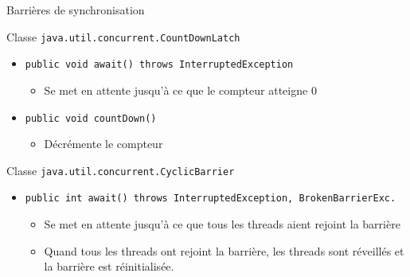 
\begingroup

\begin{frame}{Barrières de synchronisation}

  \begin{exampleblock}{Classe \lstinline+java.util.concurrent.CountDownLatch+}
    \begin{itemize}
    \item \lstinline+public void await() throws InterruptedException+\\
      \begin{itemize}
      \item Se met en attente jusqu'à ce que le compteur atteigne 0
      \end{itemize}
      \medskip
    \item \lstinline+public void countDown()+\\
      \begin{itemize}
      \item Décrémente le compteur
      \end{itemize}
    \end{itemize}
  \end{exampleblock}

  \bigskip
  
  \begin{exampleblock}{Classe \lstinline{java.util.concurrent.CyclicBarrier}}
    \begin{itemize}
    \item\lstinline{public int await() throws InterruptedException, BrokenBarrierExc.}\\
      \begin{itemize}
      \item Se met en attente jusqu'à ce que tous les threads aient rejoint la barrière
      \item Quand tous les threads ont rejoint la barrière, les threads sont réveillés et la barrière est réinitialisée.
      \end{itemize}
    \end{itemize}
  \end{exampleblock}
  
\end{frame}

\endgroup
\endinput
